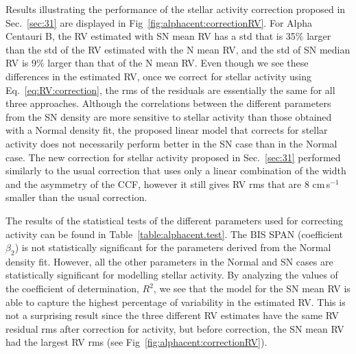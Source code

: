 \documentclass{aa}
\def\cms{\hbox{\,cm\,s$^{-1}$}}       %
\begin{document}
Results illustrating the performance of the stellar activity correction proposed in Sec.~\ref{sec:31} are displayed in Fig~\ref{fig:alphacent:correctionRV}. 
For Alpha Centauri B, the RV estimated with SN mean RV has a std that is 35\% larger than the std of the RV estimated with the N mean RV, and the std of SN median RV is 9\% larger than that of the N mean RV.
Even though we see these differences in the estimated RV, once we correct for stellar activity using Eq.~\eqref{eq:RV:correction}, 
the rms of the residuals are essentially the same for all three approaches.
Although the correlations between the different parameters from the SN density are more sensitive to stellar activity than those obtained with a Normal density fit,
the proposed linear model that corrects for stellar activity does not necessarily perform better in the SN case than in the Normal case. 
The new correction for stellar activity proposed in Sec.~\ref{sec:31} performed similarly to the usual correction that uses only a linear combination of the width and the asymmetry of the CCF, however it still gives RV rms that are 8\,\cms\,smaller than the usual correction.


The results of the statistical tests of the different parameters used for correcting activity can be found in Table~\ref{table:alphacent.test}.  The BIS SPAN (coefficient $\beta_2$) is not statistically significant for the parameters derived from the Normal density fit. 
However, all the other parameters in the Normal and SN cases are statistically significant for modelling stellar activity. 
By analyzing the values of the coefficient of determination, $R^2$, we see that the model for the SN mean RV is able to capture the highest percentage of variability in the estimated RV. 
This is not a surprising result since the three different RV estimates have the same RV residual rms after correction for activity, but before correction, the SN mean RV had the largest RV rms (see Fig~\ref{fig:alphacent:correctionRV}).
\end{document}
